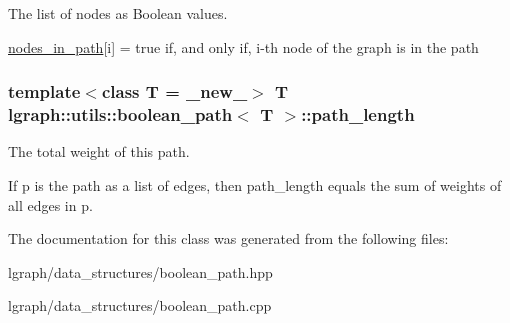 The list of nodes as Boolean values. 

\hyperlink{classlgraph_1_1utils_1_1boolean__path_ab94143c4100d65e2989fb150d6112818}{nodes\+\_\+in\+\_\+path}\mbox{[}i\mbox{]} = true if, and only if, i-\/th node of the graph is in the path 
\subsubsection[{\texorpdfstring{path\+\_\+length}{path_length}}]{\setlength{\rightskip}{0pt plus 5cm}template$<$class T = \+\_\+new\+\_\+$>$ T {\bf lgraph\+::utils\+::boolean\+\_\+path}$<$ T $>$\+::path\+\_\+length\hspace{0.3cm}{\ttfamily [private]}}\hypertarget{classlgraph_1_1utils_1_1boolean__path_a35ff8125a2ef2418feb576d2fe528517}{}\label{classlgraph_1_1utils_1_1boolean__path_a35ff8125a2ef2418feb576d2fe528517}


The total weight of this path. 

If \textquotesingle{}p\textquotesingle{} is the path as a list of edges, then \textquotesingle{}path\+\_\+length\textquotesingle{} equals the sum of weights of all edges in \textquotesingle{}p\textquotesingle{}. 

The documentation for this class was generated from the following files\+:\begin{DoxyCompactItemize}
\item 
lgraph/data\+\_\+structures/boolean\+\_\+path.\+hpp\item 
lgraph/data\+\_\+structures/boolean\+\_\+path.\+cpp\end{DoxyCompactItemize}
